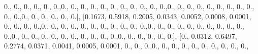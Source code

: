 \documentclass[
]{book}
\newenvironment{Shaded}{\begin{snugshade}}{\end{snugshade}}
\newcommand{\FloatTok}[1]{\textcolor[rgb]{0.00,0.00,0.81}{#1}}
\newcommand{\NormalTok}[1]{#1}
\begin{document}
\begin{Shaded}
\begin{Highlighting}[]
\FloatTok{0.}\NormalTok{, }\FloatTok{0.}\NormalTok{, }\FloatTok{0.}\NormalTok{, }\FloatTok{0.}\NormalTok{, }\FloatTok{0.}\NormalTok{, }\FloatTok{0.}\NormalTok{,}\FloatTok{0.}\NormalTok{, }\FloatTok{0.}\NormalTok{, }\FloatTok{0.}\NormalTok{, }\FloatTok{0.}\NormalTok{, }\FloatTok{0.}\NormalTok{, }\FloatTok{0.}\NormalTok{, }\FloatTok{0.}\NormalTok{, }\FloatTok{0.}\NormalTok{, }\FloatTok{0.}\NormalTok{, }\FloatTok{0.}\NormalTok{, }\FloatTok{0.}\NormalTok{,}\FloatTok{0.}\NormalTok{, }\FloatTok{0.}\NormalTok{, }\FloatTok{0.}\NormalTok{,}
\FloatTok{0.}\NormalTok{, }\FloatTok{0.}\NormalTok{, }\FloatTok{0.}\NormalTok{, }\FloatTok{0.}\NormalTok{, }\FloatTok{0.}\NormalTok{, }\FloatTok{0.}\NormalTok{, }\FloatTok{0.}\NormalTok{, }\FloatTok{0.}\NormalTok{,}\FloatTok{0.}\NormalTok{, }\FloatTok{0.}\NormalTok{, }\FloatTok{0.}\NormalTok{, }\FloatTok{0.}\NormalTok{, }\FloatTok{0.}\NormalTok{, }\FloatTok{0.}\NormalTok{], [}\FloatTok{0.1673}\NormalTok{, }\FloatTok{0.5918}\NormalTok{, }\FloatTok{0.2005}\NormalTok{,}
\FloatTok{0.0343}\NormalTok{, }\FloatTok{0.0052}\NormalTok{, }\FloatTok{0.0008}\NormalTok{, }\FloatTok{0.0001}\NormalTok{, }\FloatTok{0.}\NormalTok{, }\FloatTok{0.}\NormalTok{, }\FloatTok{0.}\NormalTok{, }\FloatTok{0.}\NormalTok{,}\FloatTok{0.}\NormalTok{, }\FloatTok{0.}\NormalTok{, }\FloatTok{0.}\NormalTok{, }\FloatTok{0.}\NormalTok{, }\FloatTok{0.}\NormalTok{, }\FloatTok{0.}\NormalTok{, }\FloatTok{0.}\NormalTok{, }\FloatTok{0.}\NormalTok{,}
\FloatTok{0.}\NormalTok{, }\FloatTok{0.}\NormalTok{, }\FloatTok{0.}\NormalTok{,}\FloatTok{0.}\NormalTok{, }\FloatTok{0.}\NormalTok{, }\FloatTok{0.}\NormalTok{, }\FloatTok{0.}\NormalTok{, }\FloatTok{0.}\NormalTok{, }\FloatTok{0.}\NormalTok{, }\FloatTok{0.}\NormalTok{, }\FloatTok{0.}\NormalTok{, }\FloatTok{0.}\NormalTok{, }\FloatTok{0.}\NormalTok{, }\FloatTok{0.}\NormalTok{,}\FloatTok{0.}\NormalTok{, }\FloatTok{0.}\NormalTok{, }\FloatTok{0.}\NormalTok{, }\FloatTok{0.}\NormalTok{, }\FloatTok{0.}\NormalTok{, }\FloatTok{0.}\NormalTok{,}
\FloatTok{0.}\NormalTok{, }\FloatTok{0.}\NormalTok{, }\FloatTok{0.}\NormalTok{, }\FloatTok{0.}\NormalTok{, }\FloatTok{0.}\NormalTok{,}\FloatTok{0.}\NormalTok{, }\FloatTok{0.}\NormalTok{, }\FloatTok{0.}\NormalTok{, }\FloatTok{0.}\NormalTok{, }\FloatTok{0.}\NormalTok{, }\FloatTok{0.}\NormalTok{], [}\FloatTok{0.}\NormalTok{, }\FloatTok{0.0312}\NormalTok{, }\FloatTok{0.6497}\NormalTok{, }\FloatTok{0.2774}\NormalTok{, }\FloatTok{0.0371}\NormalTok{,}
\FloatTok{0.0041}\NormalTok{, }\FloatTok{0.0005}\NormalTok{, }\FloatTok{0.0001}\NormalTok{, }\FloatTok{0.}\NormalTok{, }\FloatTok{0.}\NormalTok{, }\FloatTok{0.}\NormalTok{,}\FloatTok{0.}\NormalTok{, }\FloatTok{0.}\NormalTok{, }\FloatTok{0.}\NormalTok{, }\FloatTok{0.}\NormalTok{, }\FloatTok{0.}\NormalTok{, }\FloatTok{0.}\NormalTok{, }\FloatTok{0.}\NormalTok{, }\FloatTok{0.}\NormalTok{, }\FloatTok{0.}\NormalTok{, }\FloatTok{0.}\NormalTok{,}

\end{Highlighting}
\end{Shaded}
\end{document}
